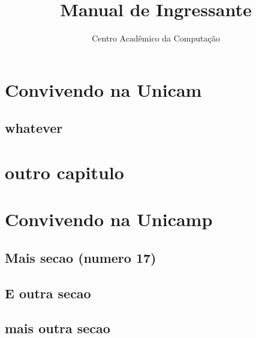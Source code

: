 \documentclass{book}
\title{Manual de Ingressante}
\author{Centro Acadêmico da Computação}
\date{\ano}
\begin{document}










\chapter{Convivendo na Unicam}
\lipsum[1-5]

\section{whatever}
\lipsum[1-5]


\chapter{outro capitulo}
\lipsum[1-5]

\chapter{Convivendo na Unicamp}
\lipsum[1-5]

\setcounter{section}{17}
\section{Mais secao (numero 17)}

\lipsum[1-5]

\section{E outra secao}

\lipsum[1-5]

\section{mais outra secao}
\end{document}
